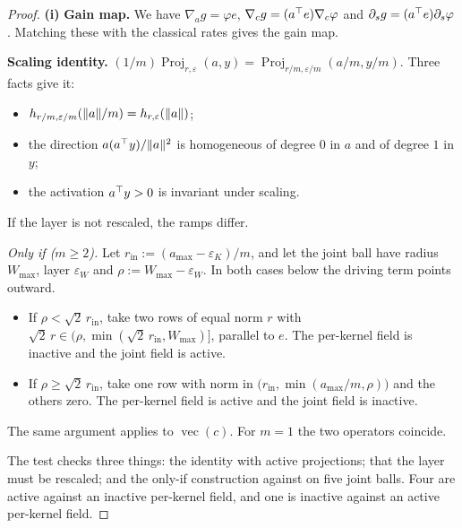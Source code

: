 
\begin{proof}
\textbf{(i)} \textbf{Gain map.} We have $\nabla_a g = \varphi e$, $\nabla_c g = (a^\top e)\nabla_c\varphi$ and
$\partial_s g = (a^\top e)\partial_s\varphi$. Matching these with the classical rates gives the gain map.

\textbf{Scaling identity.}
$(1/m)\operatorname{Proj}_{r,\varepsilon}(a,y) = \operatorname{Proj}_{r/m,\varepsilon/m}(a/m, y/m)$. Three facts give
it:
\begin{itemize}
  \item $h_{r/m,\varepsilon/m}(\lVert a\rVert/m) = h_{r,\varepsilon}(\lVert a\rVert)$;
  \item the direction $a(a^\top y)/\lVert a\rVert^2$ is homogeneous of degree $0$ in $a$ and of degree $1$ in $y$;
  \item the activation $a^\top y>0$ is invariant under scaling.
\end{itemize}
If the layer is not rescaled, the ramps differ.

\emph{Only if \textup{(}$m\ge 2$\textup{)}.} Let $r_{\mathrm{in}} := (a_{\max}-\varepsilon_K)/m$, and let the joint
ball have radius $W_{\max}$, layer $\varepsilon_W$ and $\rho := W_{\max}-\varepsilon_W$. In both cases below the
driving term points outward.
\begin{itemize}
  \item If $\rho<\sqrt2\,r_{\mathrm{in}}$, take two rows of equal norm $r$ with
    $\sqrt2\,r\in\bigl(\rho,\min(\sqrt2\,r_{\mathrm{in}},W_{\max})\bigr]$, parallel to $e$. The per-kernel field is
    inactive and the joint field is active.
  \item If $\rho\ge\sqrt2\,r_{\mathrm{in}}$, take one row with norm in
    $\bigl(r_{\mathrm{in}},\min(a_{\max}/m,\rho)\bigr)$ and the others zero. The per-kernel field is active and the
    joint field is inactive.
\end{itemize}
The same argument applies to $\operatorname{vec}(c)$. For $m = 1$ the two operators coincide.

The test  checks three things: the identity with active projections; that the layer must be
rescaled; and the only-if construction against  on five joint balls. Four are
active against an inactive per-kernel field, and one is inactive against an active per-kernel field.


\end{proof}
